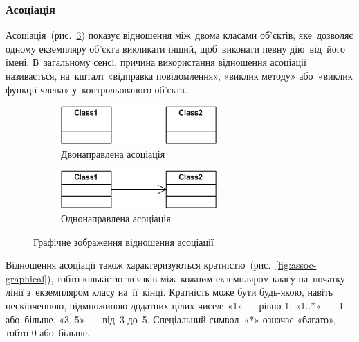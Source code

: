 \documentclass[
  a4paper,
  oneside,
  BCOR = 10mm,
  DIV = 12,
  12pt,
  headings = normal,
]{scrartcl}
\newlength{\gridunitwidth}
\begin{document}
      \subsubsection{Асоціація}
        Асоціація~(рис.~\ref{fig:assoc}) показує відношення між~двома класами об'єктів, яке~дозволяє одному екземпляру об'єкта викликати інший, щоб~виконати певну дію~від~його імені. В~загальному сенсі, причина використання відношення асоціації називається, на~кшталт «відправка повідомлення», «виклик методу» або~«виклик функції-члена» у~контрольованого об'єкта.
        \begin{figure}[!htbp]
          \centering
          \begin{subfigure}[t]{6\gridunitwidth - 0.5\gridunitwidth}
            \includegraphics[width = \columnwidth]{./assets/01-assoc-bidi.png}
            \caption{Двонаправлена асоціація}
            \label{subfig:assoc-bidi}
          \end{subfigure}%
          \hspace{1\gridunitwidth}%
          \begin{subfigure}[t]{6\gridunitwidth - 0.5\gridunitwidth}
            \includegraphics[width = \columnwidth]{./assets/02-assoc-unidi.png}
            \caption{Однонаправлена асоціація}
            \label{subfig:assoc-unidi}
          \end{subfigure}
          \caption{Графічне зображення відношення асоціації}
          \label{fig:assoc}
        \end{figure}

      Відношення асоціації також характеризуються кратністю~(рис.~\ref{fig:assoc-graphical}), тобто кількістю зв'язків між~кожним екземпляром класу на~початку лінії з~екземпляром класу на~її~кінці. Кратність може бути будь-якою, навіть нескінченною, підмножиною додатних цілих чисел: «1» — рівно 1, «1..*»~— 1 або~більше, «3..5»~— від~3 до~5. Спеціальний символ~«*» означає «багато», тобто 0 або~більше.
\end{document}
